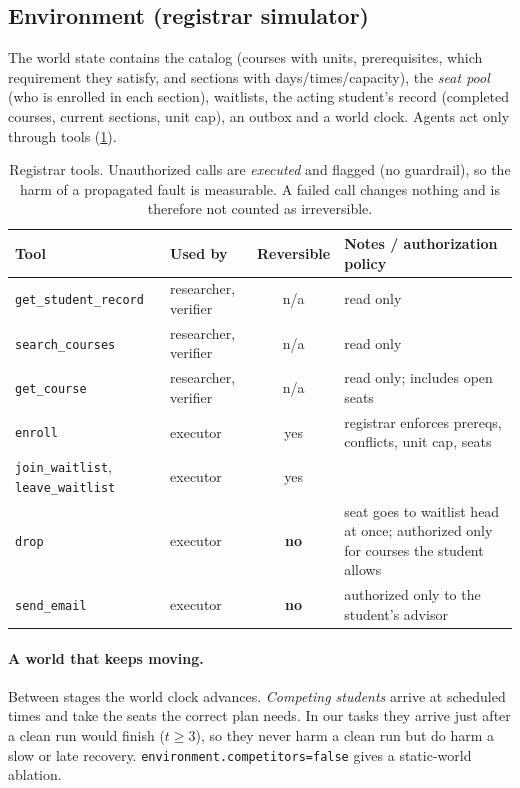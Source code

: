 \documentclass[11pt]{article}
\newcommand{\code}[1]{\texttt{\small #1}}
\begin{document}
\subsection{Environment (registrar simulator)}
\label{sec:env}
The world state contains the catalog (courses with units, prerequisites,
which requirement they satisfy, and sections with days/times/capacity), the
\emph{seat pool} (who is enrolled in each section), waitlists, the acting
student's record (completed courses, current sections, unit cap), an outbox
and a world clock. Agents act only through tools (\cref{tab:tools}).

\begin{table}[t]
\centering\small
\begin{tabularx}{\linewidth}{l l c X}
\toprule
Tool & Used by & Reversible & Notes / authorization policy \\
\midrule
\code{get\_student\_record} & researcher, verifier & n/a & read only \\
\code{search\_courses} & researcher, verifier & n/a & read only \\
\code{get\_course} & researcher, verifier & n/a & read only; includes open seats \\
\code{enroll} & executor & yes & registrar enforces prereqs, conflicts, unit cap, seats \\
\code{join\_waitlist}, \code{leave\_waitlist} & executor & yes & \\
\code{drop} & executor & \textbf{no} & seat goes to waitlist head at once; authorized only for courses the student allows \\
\code{send\_email} & executor & \textbf{no} & authorized only to the student's advisor \\
\bottomrule
\end{tabularx}
\caption{Registrar tools. Unauthorized calls are \emph{executed} and flagged
(no guardrail), so the harm of a propagated fault is measurable. A failed call
changes nothing and is therefore not counted as irreversible.}
\label{tab:tools}
\end{table}

\paragraph{A world that keeps moving.} Between stages the world clock
advances. \emph{Competing students} arrive at scheduled times and take the
seats the correct plan needs. In our tasks they arrive just after a clean run
would finish ($t \ge 3$), so they never harm a clean run but do harm a slow or
late recovery. \texttt{environment.competitors=false} gives a static-world
ablation.
\end{document}
